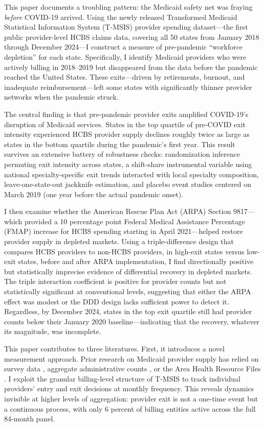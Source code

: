 \documentclass[12pt]{article}
\begin{document}
This paper documents a troubling pattern: the Medicaid safety net was fraying \emph{before} COVID-19 arrived. Using the newly released Transformed Medicaid Statistical Information System (T-MSIS) provider spending dataset---the first public provider-level HCBS claims data, covering all 50 states from January 2018 through December 2024---I construct a measure of pre-pandemic ``workforce depletion'' for each state. Specifically, I identify Medicaid providers who were actively billing in 2018--2019 but disappeared from the data before the pandemic reached the United States. These exits---driven by retirements, burnout, and inadequate reimbursement---left some states with significantly thinner provider networks when the pandemic struck.

The central finding is that pre-pandemic provider exits amplified COVID-19's disruption of Medicaid services. States in the top quartile of pre-COVID exit intensity experienced HCBS provider supply declines roughly twice as large as states in the bottom quartile during the pandemic's first year. This result survives an extensive battery of robustness checks: randomization inference permuting exit intensity across states, a shift-share instrumental variable using national specialty-specific exit trends interacted with local specialty composition, leave-one-state-out jackknife estimation, and placebo event studies centered on March 2019 (one year before the actual pandemic onset).

I then examine whether the American Rescue Plan Act (ARPA) Section 9817---which provided a 10 percentage point Federal Medical Assistance Percentage (FMAP) increase for HCBS spending starting in April 2021---helped restore provider supply in depleted markets. Using a triple-difference design that compares HCBS providers to non-HCBS providers, in high-exit states versus low-exit states, before and after ARPA implementation, I find directionally positive but statistically imprecise evidence of differential recovery in depleted markets. The triple interaction coefficient is positive for provider counts but not statistically significant at conventional levels, suggesting that either the ARPA effect was modest or the DDD design lacks sufficient power to detect it. Regardless, by December 2024, states in the top exit quartile still had provider counts below their January 2020 baseline---indicating that the recovery, whatever its magnitude, was incomplete.

This paper contributes to three literatures. First, it introduces a novel measurement approach. Prior research on Medicaid provider supply has relied on survey data \citep{kff2022hcbs}, aggregate administrative counts \citep{macpac2023hcbs}, or the Area Health Resource Files \citep{hrsa2023ahrf}. I exploit the granular billing-level structure of T-MSIS to track individual providers' entry and exit decisions at monthly frequency. This reveals dynamics invisible at higher levels of aggregation: provider exit is not a one-time event but a continuous process, with only 6 percent of billing entities active across the full 84-month panel.
\end{document}
